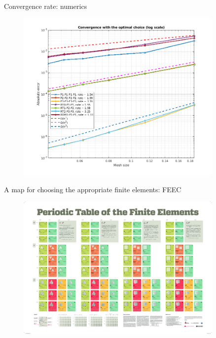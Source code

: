 \documentclass[10pt,aspectratio=43]{ISAE-Beamer}
\begin{document}
\begin{frame}{Convergence rate: numerics}
	\begin{figure}
		\centering
		\includegraphics[width=0.9\textwidth]{CVoptimal}
	\end{figure}
	
	
\end{frame}

\begin{frame}{\small A map for choosing the appropriate finite elements: FEEC}
	\begin{figure}
		\centering
		\includegraphics[width=0.9\textwidth]{FenicsFEM}
		
	\end{figure}
\end{frame}

\end{document}
